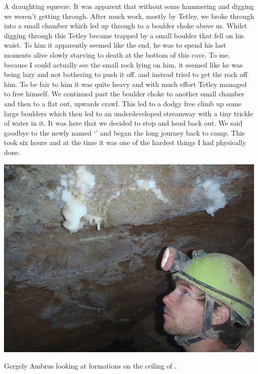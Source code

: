 A draughting squeeze. It was apparent that without some hammering and digging we weren’t getting through. After much work, mostly by Tetley, we broke through into a small chamber which led up through to a boulder choke above us. Whilst digging through this Tetley became trapped by a small boulder that fell on his waist. To him it apparently seemed like the end, he was to spend his last moments alive slowly starving to death at the bottom of this cave. To me, because I could actually see the small rock lying on him, it seemed like he was being lazy and not bothering to push it off.  and instead tried to get the rock off him. To be fair to him it was quite heavy and with much effort Tetley managed to free himself. We continued past the boulder choke to another small chamber and then to a flat out, upwards crawl. This led to a dodgy free climb up some large boulders which then led to an underdeveloped streamway with a tiny trickle of water in it. It was here that we decided to stop and head back out. We said goodbye to the newly named ‘’ and began the long journey back to camp. This took six hours and at the time it was one of the hardest things I had physically done.

\begin{pagefigure}
\checkoddpage \ifoddpage \forcerectofloat \else \forceversofloat \fi
   \centering
\includegraphics[width = \textwidth]{2012/alex_pitcher/rhys/2012-08-03-0358-Maver-P8030150--brave new world--orig.jpg}
\caption{Gergely Ambrus looking at formations on the ceiling of . } \label{brave new world}
\end{pagefigure}

